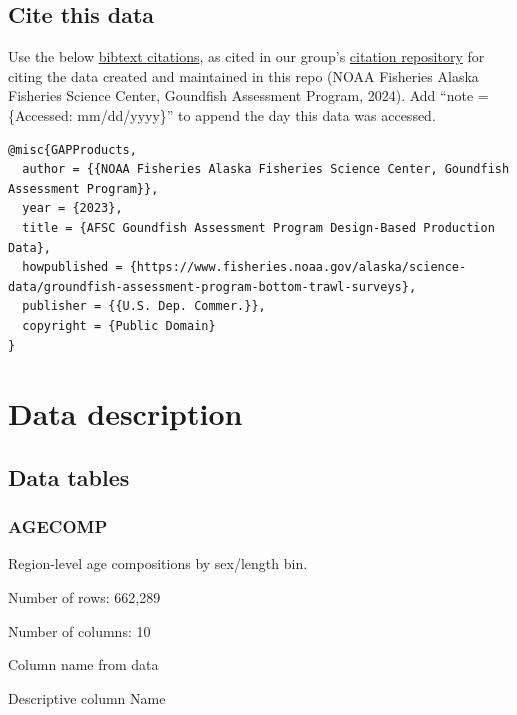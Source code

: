 \documentclass[
  letterpaper,
  oneside,
  open=any]{scrbook}
\begin{document}
\hypertarget{cite-this-data-1}{%
\section*{Cite this data}\label{cite-this-data-1}}


Use the below
\href{https://github.com/afsc-gap-products/gap_products/blob/main/code/CITATION_GAPProducts.bib}{bibtext
citations}, as cited in our group's
\href{https://github.com/afsc-gap-products/citations/blob/main/cite/bibliography.bib}{citation
repository} for citing the data created and maintained in this repo
(NOAA Fisheries Alaska Fisheries Science Center, Goundfish Assessment
Program, 2024). Add ``note = \{Accessed: mm/dd/yyyy\}'' to append the
day this data was accessed.

\begin{verbatim}
@misc{GAPProducts,
  author = {{NOAA Fisheries Alaska Fisheries Science Center, Goundfish Assessment Program}},
  year = {2023}, 
  title = {AFSC Goundfish Assessment Program Design-Based Production Data},
  howpublished = {https://www.fisheries.noaa.gov/alaska/science-data/groundfish-assessment-program-bottom-trawl-surveys},
  publisher = {{U.S. Dep. Commer.}},
  copyright = {Public Domain} 
}
\end{verbatim}

\hypertarget{data-description-1}{%
\chapter{Data description}\label{data-description-1}}

\hypertarget{data-tables}{%
\section{Data tables}\label{data-tables}}

\hypertarget{agecomp}{%
\subsection{AGECOMP}\label{agecomp}}

Region-level age compositions by sex/length bin.

Number of rows: 662,289

Number of columns: 10

Column name from data

Descriptive column Name
\end{document}
